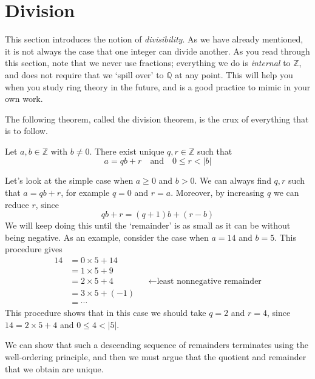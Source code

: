 \section{Division}

This section introduces the notion of \textit{divisibility}. As we have already mentioned, it is not always the case that one integer can divide another. As you read through this section, note that we never use fractions; everything we do is \textit{internal} to $\mathbb{Z}$, and does not require that we `spill over' to $\mathbb{Q}$ at any point. This will help you when you study ring theory in the future, and is a good practice to mimic in your own work.

The following theorem, called the division theorem, is the crux of everything that is to follow.

\begin{theorem}
\label{thmDivisionTheorem}
Let $a,b \in \mathbb{Z}$ with $b \ne 0$. There exist unique $q,r \in \mathbb{Z}$ such that
\[ a = qb + r \quad \text{and} \quad 0 \le r < |b| \]
\end{theorem}

\begin{strategy*}
Let's look at the simple case when $a \ge 0$ and $b > 0$. We can always find $q,r$ such that $a=qb+r$, for example $q=0$ and $r=a$. Moreover, by increasing $q$ we can reduce $r$, since
\[ qb+r = (q+1)b + (r-b) \]
We will keep doing this until the `remainder' is as small as it can be without being negative. As an example, consider the case when $a=14$ and $b=5$. This procedure gives
\begin{align*}
14 &= 0 \times 5 + 14 && \\
&= 1 \times 5 + 9 && \\
&= 2 \times 5 + 4 && \leftarrow \text{least nonnegative remainder}\\
&= 3 \times 5 + (-1) && \\
&= \cdots
\end{align*}
This procedure shows that in this case we should take $q=2$ and $r=4$, since $14 = 2 \times 5 + 4$ and $0 \le 4 < |5|$.

We can show that such a descending sequence of remainders terminates using the well-ordering principle, and then we must argue that the quotient and remainder that we obtain are unique.
\end{strategy*}

